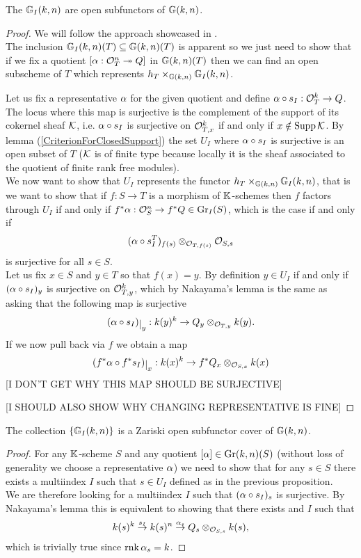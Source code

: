 \begin{proposition}\label{GrIAreOpenSubfunctors}
The $\mathbb{G}_I(k,n)$ are open subfunctors of $\mathbb{G}(k,n)$.
\end{proposition}
\begin{proof}
We will follow the approach showcased in \cite{Bejleri2}.\\
The inclusion $\mathbb{G}_I(k,n)(T)\subseteq \mathbb{G}(k,n)(T)$ is apparent so we just need to show that if we fix a quotient $[\alpha:\mathcal{O}_T^n\twoheadrightarrow Q]$ in $\mathbb{G}(k,n)(T)$ then we can find an open subscheme of $T$ which represents $h_T\times_{\mathbb{G}(k,n)}\mathbb{G}_I(k,n)$.\medskip

\noindent Let us fix a representative $\alpha$ for the given quotient and define $\alpha\circ s_I:\mathcal{O}_T^k\to Q$. The locus where this map is surjective is the complement of the support of its cokernel sheaf $\mathcal{K}$, i.e. $\alpha\circ s_I$ is surjective on $\mathcal{O}_{T,x}^k$ if and only if $x\notin \mathrm{Supp}\,\mathcal{K}$. By lemma (\ref{CriterionForClosedSupport}) the set $U_I$ where $\alpha\circ s_I$ is surjective is an open subset of $T$ ($\mathcal{K}$ is of finite type because locally it is the sheaf associated to the quotient of finite rank free modules).\\
We now want to show that $U_I$ represents the functor $h_T\times_{\mathbb{G}(k,n)}\mathbb{G}_I(k,n)$, that is we want to show that if $f:S\to T$ is a morphism of $\mathbb{K}$-schemes then $f$ factors through $U_I$ if and only if $f^\ast\alpha:\mathcal{O}_S^n\to f^\ast Q \in \mathrm{Gr}_I(S)$, which is the case if and only if \[(\alpha\circ s_I^T)_{f(s)}\otimes_{\mathcal{O}_{T,f(s)}}\mathcal{O}_{S,s}\]
is surjective for all $s\in S$.\\ 
Let us fix $x\in S$ and $y\in T$ so that $f(x)=y$. By definition $y\in U_I$ if and only if $(\alpha\circ s_I)_y$ is surjective on $\mathcal{O}_{T,y}^k$, which by Nakayama's lemma is the same as asking that the following map is surjective
\[(\al\circ s_I)\res{y}:k(y)^k\to Q_y\otimes_{\Oc_{T,y}} k(y).\]
If we now pull back via $f$ we obtain a map
\[(f^\ast \al\circ f^\ast s_I)\res{x}:k(x)^k\to f^\ast Q_x\otimes_{\Oc_{S,x}} k(x)\]
[I DON'T GET WHY THIS MAP SHOULD BE SURJECTIVE]

[I SHOULD ALSO SHOW WHY CHANGING REPRESENTATIVE IS FINE]
\end{proof}


\begin{proposition}\label{GrIAreOpenCover}
The collection $\left\{{\mathbb{G}_I(k,n)}\right\}$ is a Zariski open subfunctor cover of $\mathbb{G}(k,n)$.
\end{proposition}
\begin{proof}
For any $\mathbb{K}$-scheme $S$ and any quotient $[\alpha]\in \mathrm{Gr}(k,n)(S)$ (without loss of generality we choose a representative $\alpha$) we need to show that for any $s\in S$ there exists a multiindex $I$ such that $s\in U_I$ defined as in the previous proposition.\\
We are therefore looking for a multiindex $I$ such that $(\alpha\circ s_I)_s$ is surjective. By Nakayama's lemma this is equivalent to showing that there exists and $I$ such that
\[k(s)^k\overset{s_I}\to k(s)^n\overset{\alpha_s}\to Q_s\otimes_{\mathcal{O}_{S,s}}k(s),\]
which is trivially true since $\mathrm{rnk}\, \alpha_s=k$.
\end{proof}


